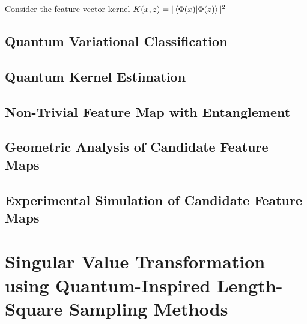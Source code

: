\documentclass[main.tex]{subfiles}
\begin{document}
Consider the feature vector kernel $K(x, z) = | \bra{\Phi(x)}\ket{\Phi(z)} |^2$

\subsection{Quantum Variational Classification}

\subsection{Quantum Kernel Estimation}

\subsection{Non-Trivial Feature Map with Entanglement}

\subsection{Geometric Analysis of Candidate Feature Maps}

\subsection{Experimental Simulation of Candidate Feature Maps}

%
%


\section{Singular Value Transformation using Quantum-Inspired Length-Square Sampling Methods}
\end{document}
